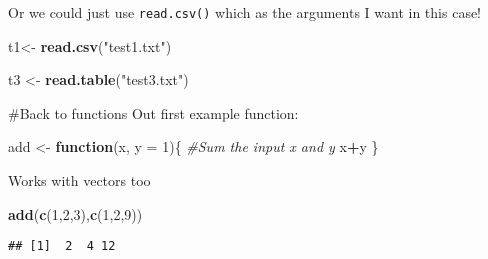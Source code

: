\documentclass[
]{article}
\newenvironment{Shaded}{\begin{snugshade}}{\end{snugshade}}
\newcommand{\CommentTok}[1]{\textcolor[rgb]{0.56,0.35,0.01}{\textit{#1}}}
\newcommand{\ControlFlowTok}[1]{\textcolor[rgb]{0.13,0.29,0.53}{\textbf{#1}}}
\newcommand{\DataTypeTok}[1]{\textcolor[rgb]{0.13,0.29,0.53}{#1}}
\newcommand{\DecValTok}[1]{\textcolor[rgb]{0.00,0.00,0.81}{#1}}
\newcommand{\KeywordTok}[1]{\textcolor[rgb]{0.13,0.29,0.53}{\textbf{#1}}}
\newcommand{\NormalTok}[1]{#1}
\newcommand{\OperatorTok}[1]{\textcolor[rgb]{0.81,0.36,0.00}{\textbf{#1}}}
\newcommand{\StringTok}[1]{\textcolor[rgb]{0.31,0.60,0.02}{#1}}
\begin{document}
Or we could just use \texttt{read.csv()} which as the arguments I want
in this case!

\begin{Shaded}
\begin{Highlighting}[]
\NormalTok{t1<-}\StringTok{ }\KeywordTok{read.csv}\NormalTok{(}\StringTok{"test1.txt"}\NormalTok{)}
\end{Highlighting}
\end{Shaded}

\begin{Shaded}
\end{Shaded}

\begin{Shaded}
\begin{Highlighting}[]
\NormalTok{t3 <-}\StringTok{ }\KeywordTok{read.table}\NormalTok{(}\StringTok{"test3.txt"}\NormalTok{)}
\end{Highlighting}
\end{Shaded}

\#Back to functions Out first example function:

\begin{Shaded}
\begin{Highlighting}[]
\NormalTok{add <-}\StringTok{ }\ControlFlowTok{function}\NormalTok{(x, }\DataTypeTok{y =} \DecValTok{1}\NormalTok{)\{}
  \CommentTok{#Sum the input x and y}
\NormalTok{  x}\OperatorTok{+}\NormalTok{y}
\NormalTok{\}}
\end{Highlighting}
\end{Shaded}

Works with vectors too

\begin{Shaded}
\begin{Highlighting}[]
\KeywordTok{add}\NormalTok{(}\KeywordTok{c}\NormalTok{(}\DecValTok{1}\NormalTok{,}\DecValTok{2}\NormalTok{,}\DecValTok{3}\NormalTok{),}\KeywordTok{c}\NormalTok{(}\DecValTok{1}\NormalTok{,}\DecValTok{2}\NormalTok{,}\DecValTok{9}\NormalTok{))}
\end{Highlighting}
\end{Shaded}

\begin{verbatim}
## [1]  2  4 12
\end{verbatim}
\end{document}
